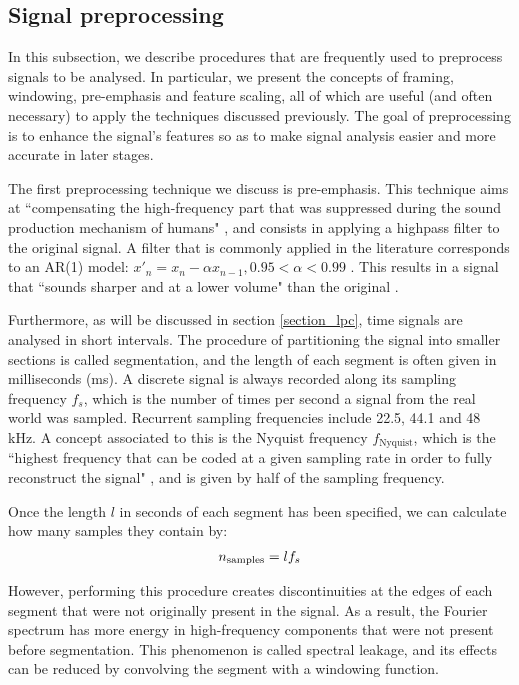 \documentclass[../main.tex]{subfiles}
\begin{document}
\subsection{Signal preprocessing} \label{subsection_preproc}
In this subsection, we describe procedures that are frequently used to preprocess signals to be analysed. In particular, we present the concepts of framing, windowing, pre-emphasis and feature scaling, all of which are useful (and often necessary) to apply the techniques discussed previously. The goal of preprocessing is to enhance the signal's features so as to make signal analysis easier and more accurate in later stages.
\par The first preprocessing technique we discuss is pre-emphasis. This technique aims at ``compensating the high-frequency part that was suppressed during the sound production mechanism of humans" \cite{Jang1996}, and consists in applying a highpass filter to the original signal. A filter that is commonly applied in the literature corresponds to an AR(1) model: $x'_n = x_n - \alpha x_{n-1}, 0.95< \alpha < 0.99 $ \cite{Shimodaira2013}. This results in a signal that ``sounds sharper and at a lower volume" than the original \cite{Jang1996}. 
\par Furthermore, as will be discussed in section \ref{section_lpc}, time signals are analysed in short intervals. The procedure of partitioning the signal into smaller sections is called segmentation, and the length of each segment is often given in milliseconds (ms). A discrete signal is always recorded along its sampling frequency $f_s$, which is the number of times per second a signal from the real world was sampled. Recurrent sampling frequencies include 22.5, 44.1 and 48 kHz. A concept associated to this is the Nyquist frequency $f_{\text{Nyquist}}$, which is the ``highest frequency that can be coded at a given sampling rate in order to fully reconstruct the signal" \cite{Weisstein2015b}, and is given by half of the sampling frequency.
\par Once the length $l$ in seconds of each segment has been specified, we can calculate how many samples they contain by:
\begin{align*}
n_{\text{samples}} = l \* f_s
\end{align*}
\par However, performing this procedure creates discontinuities at the edges of each segment that were not originally present in the signal. As a result, the Fourier spectrum has more energy in high-frequency components \cite{NationalInstruments2015} that were not present before segmentation. This phenomenon is called spectral leakage, and its effects can be reduced by convolving the segment with a windowing function. 
\end{document}
